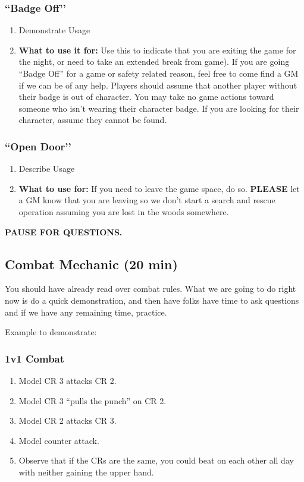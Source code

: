 \documentclass[green]{GL2020}
\begin{document}
\subsubsection*{``Badge Off’’}
	\begin{enumerate}
		\item Demonstrate Usage
		\item \textbf{What to use it for:} Use this to indicate that you are exiting the game for the night, or need to take an extended break from game). If you are going ``Badge Off'' for a game or safety related reason, feel free to come find a GM if we can be of any help. Players should assume that another player without their badge is out of character. You may take no game actions toward someone who isn’t wearing their character badge. If you are looking for their character, assume they cannot be found.
\end{enumerate}		
	
\subsubsection*{``Open Door’’}	
	\begin{enumerate}
		\item Describe Usage
		\item \textbf{What to use for:} If you need to leave the game space, do so. \textbf{PLEASE} let a GM know that you are leaving so we don’t start a search and rescue operation assuming you are lost in the woods somewhere.
	\end{enumerate}


\textbf{PAUSE FOR QUESTIONS.}

\subsection*{Combat Mechanic (20 min)}

You should have already read over combat rules.  What we are going to do right now is do a quick demonstration, and then have folks have time to ask questions and if we have any remaining time, practice.

Example to demonstrate:


\subsubsection*{1v1 Combat}
\begin{enumerate}
	\item Model CR 3 attacks CR 2.
	\item Model CR 3 ``pulls the punch'' on CR 2.
	\item Model CR 2 attacks CR 3.
	\item Model counter attack.
	
	\item Observe that if the CRs are the same, you could beat on each other all day with neither gaining the upper hand.
\end{enumerate}
\end{document}
